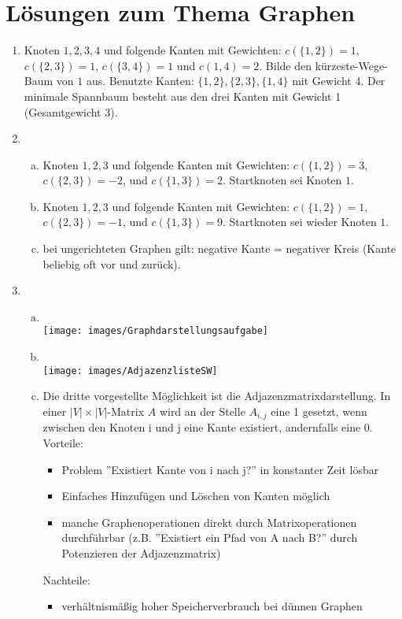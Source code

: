 \documentclass{scrartcl}
\begin{document}
\section*{Lösungen zum Thema Graphen}
\begin{enumerate}[(1)]

\item Knoten $1,2,3,4$ und folgende Kanten mit Gewichten: $c(\{1,2\})=1$, $c(\{2,3\})=1$, $c(\{3,4\})=1$ und $c({1,4})=2$.
Bilde den k\"urzeste-Wege-Baum von $1$ aus. Benutzte Kanten: $\{1,2\}, \{2,3\}, \{1,4\}$ mit Gewicht 4.
Der minimale Spannbaum besteht aus den drei Kanten mit Gewicht 1 (Gesamtgewicht 3).

\item \begin{enumerate}[(a)]
\item Knoten $1,2,3$ und folgende Kanten mit Gewichten: $c(\{1,2\})=3$, $c(\{2,3\})=-2$, und $c(\{1,3\})=2$. Startknoten sei Knoten $1$.
\item Knoten $1,2,3$ und folgende Kanten mit Gewichten: $c(\{1,2\})=1$, $c(\{2,3\})=-1$, und $c(\{1,3\})=9$. Startknoten sei wieder Knoten $1$.
\item bei ungerichteten Graphen gilt: negative Kante = negativer Kreis (Kante beliebig oft vor und zur\"uck).
\end{enumerate}

\item \begin{enumerate}[(a)]
	\item \ \\ \texttt{[image: images/Graphdarstellungsaufgabe]}
	\item \ \\ \texttt{[image: images/AdjazenzlisteSW]}
	\item Die dritte vorgestellte Möglichkeit ist die Adjazenzmatrixdarstellung. In einer $|V| \times |V|$-Matrix $A$ wird an der Stelle $A_{i,j}$ eine 1 gesetzt, wenn zwischen den Knoten i und j eine Kante existiert, andernfalls eine 0.\\
	Vorteile:
	\begin{itemize}
		\item Problem ''Existiert Kante von i nach j?'' in konstanter Zeit lösbar
		\item Einfaches Hinzufügen und Löschen von Kanten möglich
		\item manche Graphenoperationen direkt durch Matrixoperationen durchführbar (z.B. ''Existiert ein Pfad von A nach B?'' durch Potenzieren der Adjazenzmatrix)
	\end{itemize}
	Nachteile:
	\begin{itemize}
		\item verhältnismäßig hoher Speicherverbrauch bei dünnen Graphen
	\end{itemize}
\end{enumerate}
\end{enumerate}
\end{document}
